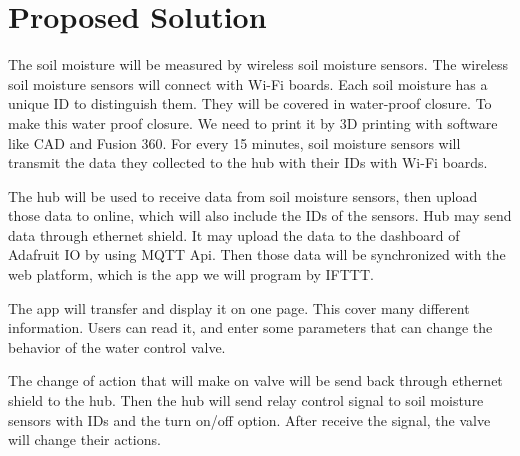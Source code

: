 \documentclass[10pt,onecolumn,journal,draftclsnofoot]{IEEEtran}
\begin{document}
\section{Proposed Solution}
\par
The soil moisture will be measured by wireless soil moisture sensors. The wireless soil moisture sensors will connect with Wi-Fi boards. Each soil moisture has a unique ID to distinguish them. They will be covered in water-proof closure. To make this water proof closure. We need to print it by 3D printing with software like CAD and Fusion 360. For every 15 minutes, soil moisture sensors will transmit the data they collected to the hub with their IDs with Wi-Fi boards. 
\\
\par
The hub will be used to receive data from soil moisture sensors, then upload those data to online, which will also include the IDs of the sensors. Hub may send data through ethernet shield. It may upload the data to the dashboard of Adafruit IO by using MQTT Api. Then those data will be synchronized with the web platform, which is the app we will program by IFTTT.
\par
The app will transfer and display it on one page. This cover many different information. Users can read it, and enter some parameters that can change the behavior of the water control valve. 
\par
The change of action that will make on valve will be send back through ethernet shield to the hub. Then the hub will send relay control signal to soil moisture sensors with IDs and the turn on/off option. After receive the signal, the valve will change their actions.
\newpage
\end{document}
